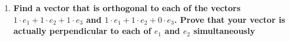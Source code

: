 \documentclass{article}
\begin{document}
\begin{enumerate}[4.]
\item\textbf{Find a vector that is orthogonal to each of the vectors $1\cdot e_{1}+1\cdot e_{2}+1\cdot e_{3}$ and $1\cdot e_{1}+1\cdot e_{2}+0\cdot e_{3}$. Prove that your vector is actually perpendicular to
each of $e_{1}$ and $e_{2}$ simultaneously}
\end{enumerate}
\end{document}
